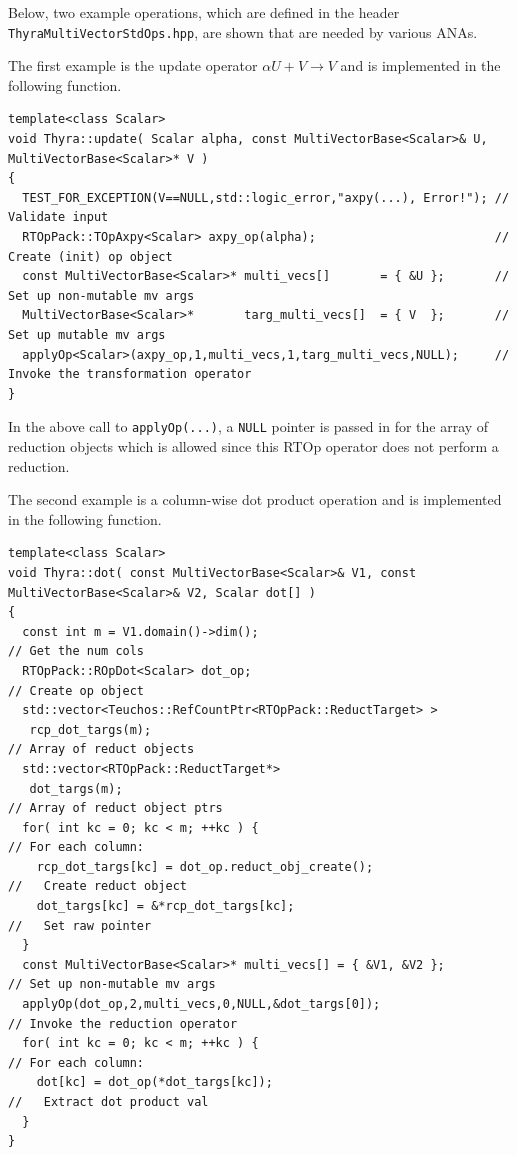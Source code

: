 \documentclass[pdf,ps2pdf,11pt]{SANDreport}
\begin{document}
Below, two example operations, which are defined in the header
{}\texttt{Thyra\-Multi\-Vector\-Std\-Ops.hpp}, are shown that are
needed by various ANAs.

The first example is the update operator $\alpha U + V \rightarrow V$
and is implemented in the following function.

{\scriptsize\begin{verbatim}
template<class Scalar>
void Thyra::update( Scalar alpha, const MultiVectorBase<Scalar>& U, MultiVectorBase<Scalar>* V )
{
  TEST_FOR_EXCEPTION(V==NULL,std::logic_error,"axpy(...), Error!"); // Validate input
  RTOpPack::TOpAxpy<Scalar> axpy_op(alpha);                         // Create (init) op object
  const MultiVectorBase<Scalar>* multi_vecs[]       = { &U };       // Set up non-mutable mv args
  MultiVectorBase<Scalar>*       targ_multi_vecs[]  = { V  };       // Set up mutable mv args
  applyOp<Scalar>(axpy_op,1,multi_vecs,1,targ_multi_vecs,NULL);     // Invoke the transformation operator
}
\end{verbatim}}

{}\noindent{}In the above call to {}\texttt{applyOp(\-...)}, a
{}\texttt{NULL} pointer is passed in for the array of reduction
objects which is allowed since this RTOp operator does not perform a
reduction.

The second example is a column-wise dot product operation and is
implemented in the following function.

{\scriptsize\begin{verbatim}
template<class Scalar>
void Thyra::dot( const MultiVectorBase<Scalar>& V1, const MultiVectorBase<Scalar>& V2, Scalar dot[] )
{
  const int m = V1.domain()->dim();                                      // Get the num cols
  RTOpPack::ROpDot<Scalar> dot_op;                                       // Create op object
  std::vector<Teuchos::RefCountPtr<RTOpPack::ReductTarget> >
   rcp_dot_targs(m);                                                     // Array of reduct objects
  std::vector<RTOpPack::ReductTarget*>
   dot_targs(m);                                                         // Array of reduct object ptrs
  for( int kc = 0; kc < m; ++kc ) {                                      // For each column:
    rcp_dot_targs[kc] = dot_op.reduct_obj_create();                      //   Create reduct object
    dot_targs[kc] = &*rcp_dot_targs[kc];                                 //   Set raw pointer
  }
  const MultiVectorBase<Scalar>* multi_vecs[] = { &V1, &V2 };            // Set up non-mutable mv args
  applyOp(dot_op,2,multi_vecs,0,NULL,&dot_targs[0]);                     // Invoke the reduction operator
  for( int kc = 0; kc < m; ++kc ) {                                      // For each column:
    dot[kc] = dot_op(*dot_targs[kc]);                                    //   Extract dot product val
  }
}
\end{verbatim}}
\end{document}
